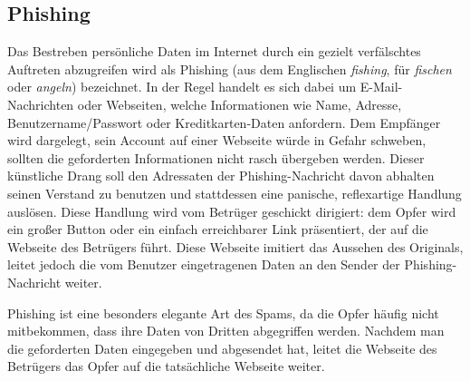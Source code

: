 \subsection{Phishing}
\label{sub:phishing}
Das Bestreben persönliche Daten im Internet durch ein gezielt verfälschtes
Auftreten abzugreifen wird als Phishing (aus dem Englischen \emph{fishing}, für
\emph{fischen} oder \emph{angeln}) bezeichnet. In der Regel handelt es sich
dabei um E-Mail-Nachrichten oder Webseiten, welche Informationen wie Name,
Adresse, Benutzername/Passwort oder Kreditkarten-Daten anfordern. Dem Empfänger
wird dargelegt, sein Account auf einer Webseite würde in Gefahr schweben,
sollten die geforderten Informationen nicht rasch übergeben werden. Dieser
künstliche Drang soll den Adressaten der Phishing-Nachricht davon abhalten
seinen Verstand zu benutzen und stattdessen eine panische, reflexartige
Handlung auslösen. Diese Handlung wird vom Betrüger geschickt dirigiert: dem
Opfer wird ein großer Button oder ein einfach erreichbarer Link präsentiert,
der auf die Webseite des Betrügers führt. Diese Webseite imitiert das Aussehen
des Originals, leitet jedoch die vom Benutzer eingetragenen Daten an den Sender
der Phishing-Nachricht weiter.

Phishing ist eine besonders elegante Art des Spams, da die Opfer häufig nicht
mitbekommen, dass ihre Daten von Dritten abgegriffen werden. Nachdem man die
geforderten Daten eingegeben und abgesendet hat, leitet die Webseite des
Betrügers das Opfer auf die tatsächliche Webseite weiter.
